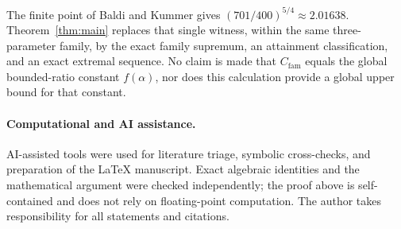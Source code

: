 \documentclass[11pt]{article}
\begin{document}
The finite point of Baldi and Kummer gives
\((701/400)^{5/4}\approx2.01638\).  Theorem~\ref{thm:main} replaces that
single witness, within the same three-parameter family, by the exact family
supremum, an attainment classification, and an exact extremal sequence.  No
claim is made that \(C_{\mathrm{fam}}\) equals the global bounded-ratio
constant \(f(\alpha)\), nor does this calculation provide a global upper
bound for that constant.

\paragraph{Computational and AI assistance.}
AI-assisted tools were used for literature triage, symbolic cross-checks,
and preparation of the \LaTeX{} manuscript.  Exact algebraic identities and
the mathematical argument were checked independently; the proof above is
self-contained and does not rely on floating-point computation.  The author
takes responsibility for all statements and citations.



\end{document}
